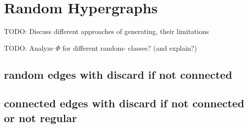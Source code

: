 \chapter{Random Hypergraphs}\label{chapter:random_hypergraphs}


TODO: Discuss different approaches of generating, their limitations

TODO: Analyze $\Phi$ for different random- classes? (and explain?)

\section{random edges with discard if not connected}

\section{connected edges with discard if not connected or not regular}